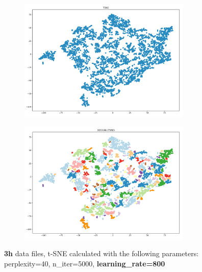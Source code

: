 \begin{figure}[H]
	\centering
	
  \centering
	\begin{subfigure}{.5\textwidth}
    \centering
    \includegraphics[width=0.9\textwidth]{./images/tsneParametersTest/learningRate/lr800-3hTSNE.png}
  \end{subfigure}%
  \begin{subfigure}{.5\textwidth}
    \centering
    \includegraphics[width=0.9\textwidth]{./images/tsneParametersTest/learningRate/lr800-3hDBSCAN.png}
	\end{subfigure}
	\caption{\textbf{3h} data files, t-SNE calculated with the following parameters: perplexity=40, n\_iter=5000, \textbf{learning\_rate=800}}
  \label{figure:3hlr800TSNE}
\end{figure}


